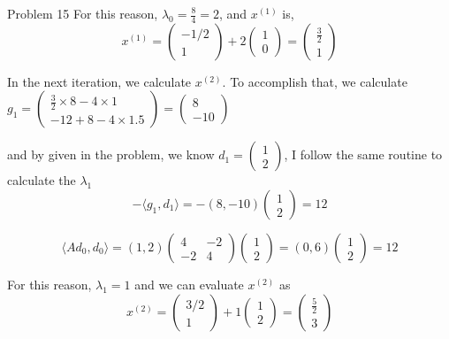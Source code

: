 \documentclass[12pt]{article}
\begin{document}
\begin{section}{Problem 15}
	For this reason, $\lambda_0 = \frac{8}{4}=2$, and $x^{(1)}$ is, 
	\[x^{(1)} = \begin{pmatrix}
	-1/2\\
	1
	\end{pmatrix} + 2 \begin{pmatrix}
	1\\
	0
	\end{pmatrix} = \begin{pmatrix}
	\frac{3}{2}\\
	1
	\end{pmatrix} \]
	
	In the next iteration, we calculate $x^{(2)}$. To accomplish that, we calculate $g_1 = \begin{pmatrix}
	\frac{3}{2} \times 8 - 4 \times 1\\
	-12 + 8 - 4 \times 1.5
	\end{pmatrix} = \begin{pmatrix}
	8\\
	-10
	\end{pmatrix}$
	
	and by given in the problem, we know $d_1 = \begin{pmatrix}
	1\\
	2
	\end{pmatrix}$, I follow the same routine to calculate the $\lambda_1$
	\[-\langle g_1, d_1 \rangle = -(8, -10) \begin{pmatrix}
	1\\
	2
	\end{pmatrix} = 12\] 
	
	\[\langle Ad_0, d_0 \rangle  = (1,2) \begin{pmatrix}
	4 & -2\\
	-2 & 4
	\end{pmatrix} \begin{pmatrix}
	1\\
	2
	\end{pmatrix} = (0, 6) \begin{pmatrix}
	1\\
	2
	\end{pmatrix} = 12\]
	
	For this reason, $\lambda_1 = 1$ and we can evaluate $x^{(2)}$ as
	\[x^{(2)} = \begin{pmatrix}
	3/2\\
	1
	\end{pmatrix} + 1 \begin{pmatrix}
	1\\
	2
	\end{pmatrix} = \begin{pmatrix}
	\frac{5}{2}\\
	3
	\end{pmatrix} \]
	 

\end{section}
\end{document}
